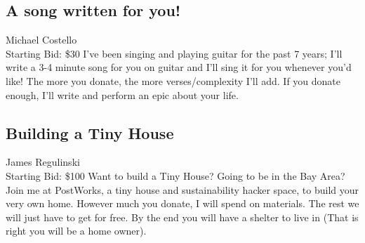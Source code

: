 \documentclass[11pt]{article}
\begin{document}
\subsection{A song written for you!}
Michael Costello
\\
Starting Bid: \$30
\newline
I've been singing and playing guitar for the past 7 years; I'll write a 3-4 minute song for you on guitar and I'll sing it for you whenever you'd like!
The more you donate, the more verses/complexity I'll add. If you donate enough, I'll write and perform an epic about your life.
\subsection{Building a Tiny House}
James Regulinski
\\
Starting Bid: \$100
\newline
Want to build a Tiny House? Going to be in the Bay Area? Join me at PostWorks, a tiny house and sustainability hacker space, to build your very own home.  However much you donate, I will spend on materials. The rest we will just have to get for free. By the end you will have a shelter to live in (That is right you will be a home owner).
\end{document}
